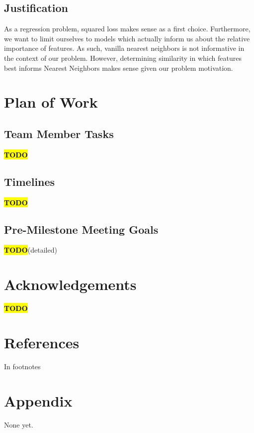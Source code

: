 \documentclass{article}
\newcommand{\TODO}{\textcolor{red}{\textbf{\hl{TODO}}}}
\begin{document}
\begin{multicols}{2}
\subsection{Justification} As a regression problem, squared loss makes sense as a first choice. Furthermore, we want to limit ourselves to models which actually inform us about the relative importance of features. As such, vanilla nearest neighbors is not informative in the context of our problem. However, determining similarity in which features best informs Nearest Neighbors makes sense given our problem motivation.

\section{Plan of Work}
\subsection{Team Member Tasks} \TODO
\subsection{Timelines} \TODO
\subsection{Pre-Milestone Meeting Goals} \TODO (detailed)

\section{Acknowledgements} \TODO

\end{multicols}

\pagebreak

\section{References} In footnotes

\section{Appendix} None yet.
\end{document}

